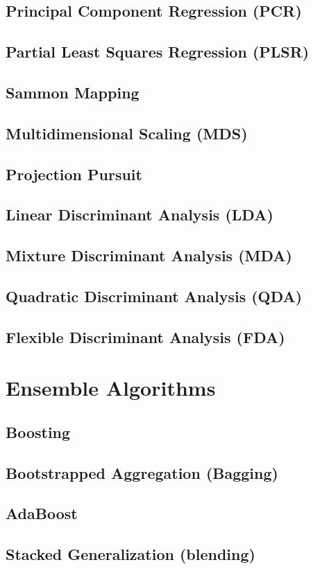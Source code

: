 \documentclass[14pt]{book}
\begin{document}
\section{Principal Component Regression (PCR)}
\section{Partial Least Squares Regression (PLSR)}
\section{Sammon Mapping}
\section{Multidimensional Scaling (MDS)}
\section{Projection Pursuit}
\section{Linear Discriminant Analysis (LDA)}
\section{Mixture Discriminant Analysis (MDA)}
\section{Quadratic Discriminant Analysis (QDA)}
\section{Flexible Discriminant Analysis (FDA)}
\chapter{Ensemble Algorithms}
\section{Boosting}
\section{Bootstrapped Aggregation (Bagging)}
\section{AdaBoost}
\section{Stacked Generalization (blending)}
\end{document}
